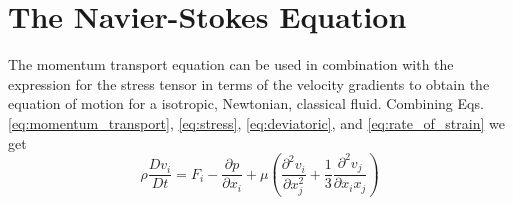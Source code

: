 \documentclass[12pt, letter]{report}
\begin{document}
\section{The Navier-Stokes Equation}
The momentum transport equation can be used in combination with the expression for the stress tensor in terms of the velocity gradients to obtain the equation of motion for a isotropic, Newtonian, classical fluid. Combining Eqs. \ref{eq:momentum_transport}, \ref{eq:stress}, \ref{eq:deviatoric}, and \ref{eq:rate_of_strain} we get
\begin{equation}   
\rho \frac{D v_i}{D t} = F_i - \frac{\partial p}{\partial x_i} + \mu \left( \frac{\partial^2 v_i}{\partial x_j^2} + \frac{1}{3} \frac{\partial^2 v_j}{\partial x_i x_j}\right)
\end{equation}









\end{document}
